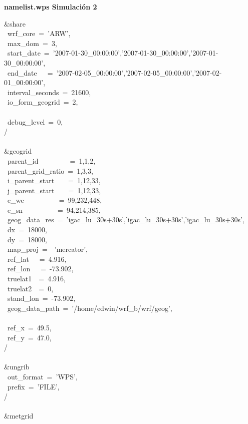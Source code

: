 \textbf{namelist.wps Simulación 2}


\&share\\
~wrf\_core~=~'ARW',\\
~max\_dom~=~3,\\
~start\_date~=~'2007-01-30\_00:00:00','2007-01-30\_00:00:00','2007-01-30\_00:00:00',\\
~end\_date~~~=~'2007-02-05\_00:00:00','2007-02-05\_00:00:00','2007-02-01\_00:00:00',\\
~interval\_seconds~=~21600,\\
~io\_form\_geogrid~=~2,\\
\\
~debug\_level~=~0,\\
/\\
\\
\&geogrid\\
~parent\_id~~~~~~~~~=~1,1,2,\\
~parent\_grid\_ratio~=~1,3,3,\\
~i\_parent\_start~~~~=~1,12,33,\\
~j\_parent\_start~~~~=~1,12,33,\\
~e\_we~~~~~~~~~~=~99,232,448,\\
~e\_sn~~~~~~~~~~=~94,214,385,\\
~geog\_data\_res~=~'igac\_lu\_30s+30s','igac\_lu\_30s+30s','igac\_lu\_30s+30s',\\
~dx~=~18000,\\
~dy~=~18000,\\
~map\_proj~=~~'mercator',\\
~ref\_lat~~~=~4.916,\\
~ref\_lon~~~=~-73.902,\\
~truelat1~~=~4.916,\\
~truelat2~~=~0,\\
~stand\_lon~=~-73.902,\\
~geog\_data\_path~=~'/home/edwin/wrf\_b/wrf/geog',\\
\\
~ref\_x~=~49.5,\\
~ref\_y~=~47.0,\\
/\\
\\
\&ungrib\\
~out\_format~=~'WPS',\\
~prefix~=~'FILE',\\
/\\
\\
\&metgrid\\
